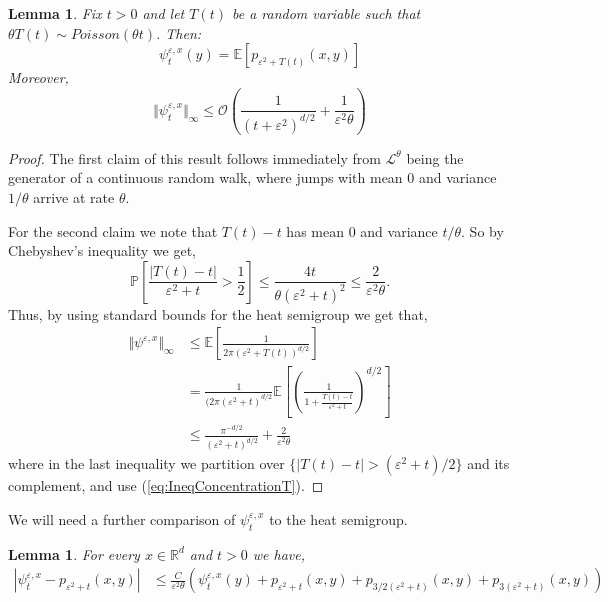 \documentclass[a4paper,12pt]{article}
\newtheorem{lemma}[theorem]{Lemma}
\newcommand{\EE}{\mathbb{E}}
\newcommand{\PP}{\mathbb{P}}
\newcommand{\1}{{\bf {1}}}
\def\epsilon{\varepsilon}
\begin{document}
\begin{lemma} \label{PsiBoundHS}
Fix $t>0$ and let $T(t)$ be a random variable such that $\theta T(t) \sim Poisson(\theta t)$. Then:
\[ \psi^{\epsilon,x}_t(y) = \mathbb{E}\left[ p_{\epsilon^2+T(t)}(x,y)\right] \]
Moreover,
\[ \Vert \psi^{\epsilon,x}_t \Vert_\infty \leq \mathcal{O}\left( \frac{1}{(t+\epsilon^2)^{d/2}} + \frac{1}{\epsilon^2 \theta} \right) \]
\end{lemma}
\begin{proof}
The first claim of this result follows immediately from $\mathcal{L}^\theta$ being the generator of a continuous random walk, where jumps with mean $0$ and variance $1/\theta$ arrive at rate $\theta$.

For the second claim we note that $T(t)-t$ has mean $0$ and variance $t/\theta$.  So by Chebyshev's inequality we get,
\begin{equation}
\PP\left[  \frac{|T(t)-t|}{\epsilon^2+t} > \frac{1}{2} \right] \leq \frac{4t}{\theta(\epsilon^2+t)^2} \leq \frac{2}{\epsilon^2 \theta}. \label{eq:IneqConcentrationT}
\end{equation}
Thus, by using standard bounds for the heat semigroup we get that,
\begin{align*}
\Vert \psi^{\epsilon,x} \Vert_\infty & \leq \EE\left[  \frac{1}{2 \pi (\epsilon^2+T(t))^{d/2}}\right] \\ & = \frac{1}{(2 \pi(\epsilon^2+t)^{d/2}} \EE\left[\left(\frac{1}{1+\frac{T(t)-t}{\epsilon^2+t}} \right)^{d/2} \right] \\ &\leq \frac{\pi^{-d/2}}{(\epsilon^2+t)^{d/2}} + \frac{2}{\epsilon^2 \theta}
\end{align*}
where in the last inequality we partition over $\{ |T(t)-t| > (\epsilon^2+t)/2\}$ and its complement, and use (\ref{eq:IneqConcentrationT}).
\end{proof}
We will need a further comparison of $\psi_t^{\epsilon,x}$ to the heat semigroup.
\begin{lemma}
For every $x \in \mathbb{R}^d$ and $t>0$ we have,
\begin{align*}
|\psi_t^{\epsilon,x} - p_{\epsilon^2+t}(x,y)| &\leq \frac{C}{\epsilon^2 \theta}\left(\psi_t^{\epsilon,x}(y) + p_{\epsilon^2+t}(x,y) + p_{3/2(\epsilon^2+t)}(x,y)+p_{3(\epsilon^2+t)}(x,y) \right)
\end{align*} \label{Lemma:BoundPsiHS2}
\end{lemma}
\end{document}
